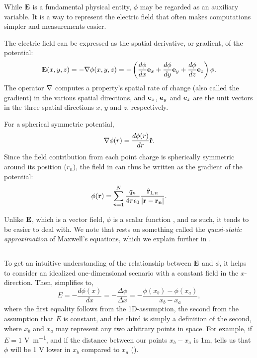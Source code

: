 While ${\bf E}$ is a fundamental physical entity, $\phi$ may be regarded as an auxiliary variable. It is a way to represent the electric field that often makes computations simpler and measurements easier. 

The electric field can be expressed as the spatial derivative, or gradient, of the potential:
\begin{equation}
{\bf E}(x,y,z) = - {\bf \nabla} \phi(x,y,z) = - \left(\frac{d\phi}{dx} {\bf e}_x  + \frac{d\phi}{dy} {\bf e}_y + \frac{d\phi}{dz} {\bf e}_z \right) \phi.
\label{eq:Basics:EV}
\end{equation}
The operator ${\bf \nabla}$ computes a property's spatial rate of change (also called the gradient) in the various spatial directions, and ${\bf e}_x$, ${\bf e}_y$ and  ${\bf e}_z$ are the unit vectors in the three spatial directions $x$, $y$ and $z$, respectively. 

For a spherical symmetric potential, 
\begin{equation}
{\bf \nabla} \phi(r) = \frac{d\phi(r)}{dr} {\bf \hat{r}}.
\label{eq:Basics:SphericalNablaPhi}
\end{equation}
Since the field contribution from each point charge is spherically symmetric around its position ($r_n$), the field in  can thus be written as the gradient of the potential: 
\begin{equation}
{\phi}({\bf r}) = \sum_{n=1}^{N}  \frac{q_n}{4\pi \epsilon_0} \frac{\hat{{\bf r}}_{1,n}}{|{\bf r}-{\bf r_n}|}.
\label{eq:Basics:CoulombPhiN}
\end{equation}

Unlike ${\bf E}$, which is a vector field, $\phi$ is a scalar function , and as such, it tends to be easier to deal with. We note that  rests on something called the \textit{quasi-static approximation} of Maxwell's equations, which we explain further in . 


\subsection{}
\label{sec:Basics:Ground} 
To get an intuitive understanding of the relationship between ${\bf E}$ and $\phi$, it helps to consider an idealized one-dimensional scenario with a constant field in the $x$-direction. Then,  simplifies to,
\begin{equation}
E = -\frac{d\phi(x)}{dx} = -\frac{\Delta \phi}{\Delta x} = -\frac{\phi(x_b)-\phi(x_a)}{x_b-x_a},
\label{eq:Basics:EV1D}
\end{equation}
where the first equality follows from the 1D-assumption, the second from the assumption that $E$ is constant, and the third is simply a definition of the second, where $x_b$ and $x_a$ may represent any two arbitrary points in space. For example, if $E = 1$ \si{\volt\per\metre}, and if the distance between our points $x_b-x_a$ is 1m,  tells us that $\phi$ will be 1 \si{\volt} lower in $x_b$ compared to $x_a$ ().

